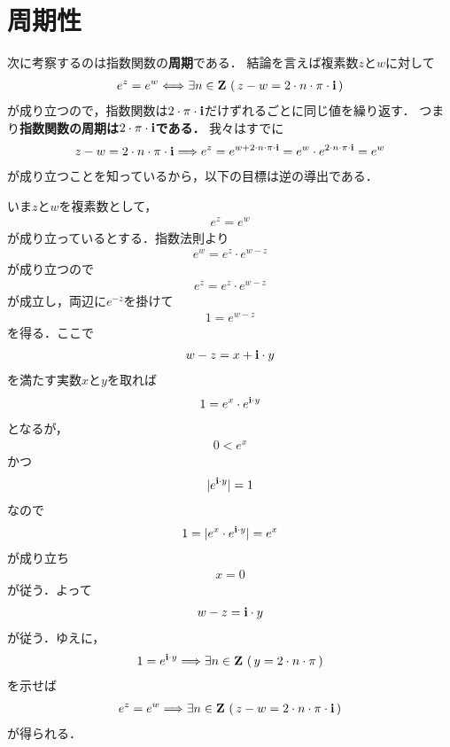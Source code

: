 \section{周期性}
	次に考察するのは指数関数の{\bf 周期}である．
	結論を言えば複素数$z$と$w$に対して
	\begin{align}
		e^{z} = e^{w} \Longleftrightarrow 
		\exists n \in \mathbf{Z}\, \left(\, z - w = 2 \cdot n \cdot \pi \cdot \mathbf{i}\, \right)
	\end{align}
	が成り立つので，指数関数は$2 \cdot \pi \cdot \mathbf{i}$だけずれるごとに同じ値を繰り返す．
	つまり{\bf 指数関数の周期は$2 \cdot \pi \cdot \mathbf{i}$である．}
	我々はすでに
	\begin{align}
		z - w = 2 \cdot n \cdot \pi \cdot \mathbf{i}
		\Longrightarrow e^{z} = e^{w + 2 \cdot n \cdot \pi \cdot \mathbf{i}}
		= e^{w} \cdot e^{2 \cdot n \cdot \pi \cdot \mathbf{i}}
		= e^{w}
	\end{align}
	が成り立つことを知っているから，以下の目標は逆の導出である．
	
	いま$z$と$w$を複素数として，
	\begin{align}
		e^{z} = e^{w}
	\end{align}
	が成り立っているとする．指数法則より
	\begin{align}
		e^{w} = e^{z} \cdot e^{w-z}
	\end{align}
	が成り立つので
	\begin{align}
		e^{z} = e^{z} \cdot e^{w-z}
	\end{align}
	が成立し，両辺に$e^{-z}$を掛けて
	\begin{align}
		1 = e^{w-z}
	\end{align}
	を得る．ここで
	\begin{align}
		w - z = x + \mathbf{i} \cdot y
	\end{align}
	を満たす実数$x$と$y$を取れば
	\begin{align}
		1 = e^{x} \cdot e^{\mathbf{i} \cdot y}
	\end{align}
	となるが，
	\begin{align}
		0 < e^{x}
	\end{align}
	かつ
	\begin{align}
		|e^{\mathbf{i} \cdot y}| = 1
	\end{align}
	なので
	\begin{align}
		1 = |e^{x} \cdot e^{\mathbf{i} \cdot y}| = e^{x}
	\end{align}
	が成り立ち
	\begin{align}
		x = 0
	\end{align}
	が従う．よって
	\begin{align}
		w - z = \mathbf{i} \cdot y
	\end{align}
	が従う．ゆえに，
	\begin{align}
		1 = e^{\mathbf{i} \cdot y} \Longrightarrow 
		\exists n \in \mathbf{Z}\, \left(\, y = 2 \cdot n \cdot \pi\, \right)
	\end{align}
	を示せば
	\begin{align}
		e^{z} = e^{w} \Longrightarrow 
		\exists n \in \mathbf{Z}\, \left(\, z - w = 2 \cdot n \cdot \pi \cdot \mathbf{i}\, \right)
	\end{align}
	が得られる．
	
